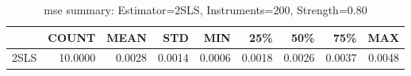 \begin{table}[ht]
\centering
\caption{mse summary: Estimator=2SLS, Instruments=200, Strength=0.80}
\begin{tabular}{lrrrrrrrr}
\toprule
 & COUNT & MEAN & STD & MIN & 25\% & 50\% & 75\% & MAX \\
\midrule
2SLS & 10.0000 & 0.0028 & 0.0014 & 0.0006 & 0.0018 & 0.0026 & 0.0037 & 0.0048 \\
\bottomrule
\end{tabular}
\end{table}
